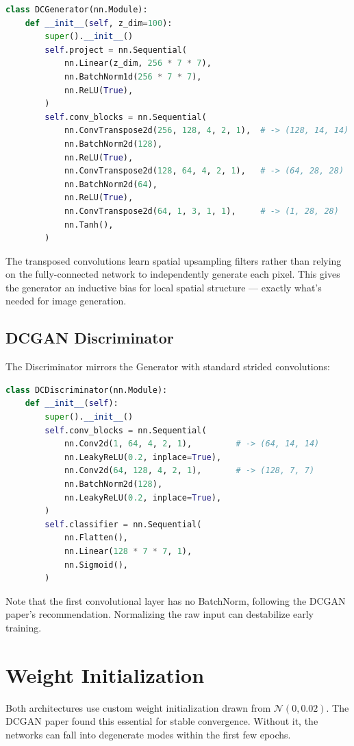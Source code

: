 \documentclass[12pt]{article}
\begin{document}
\begin{lstlisting}[language=Python]
class DCGenerator(nn.Module):
    def __init__(self, z_dim=100):
        super().__init__()
        self.project = nn.Sequential(
            nn.Linear(z_dim, 256 * 7 * 7),
            nn.BatchNorm1d(256 * 7 * 7),
            nn.ReLU(True),
        )
        self.conv_blocks = nn.Sequential(
            nn.ConvTranspose2d(256, 128, 4, 2, 1),  # -> (128, 14, 14)
            nn.BatchNorm2d(128),
            nn.ReLU(True),
            nn.ConvTranspose2d(128, 64, 4, 2, 1),   # -> (64, 28, 28)
            nn.BatchNorm2d(64),
            nn.ReLU(True),
            nn.ConvTranspose2d(64, 1, 3, 1, 1),     # -> (1, 28, 28)
            nn.Tanh(),
        )
\end{lstlisting}

The transposed convolutions learn spatial upsampling filters rather than relying on the fully-connected network to independently generate each pixel. This gives the generator an inductive bias for local spatial structure --- exactly what's needed for image generation.

\subsection{DCGAN Discriminator}
The Discriminator mirrors the Generator with standard strided convolutions:

\begin{lstlisting}[language=Python]
class DCDiscriminator(nn.Module):
    def __init__(self):
        super().__init__()
        self.conv_blocks = nn.Sequential(
            nn.Conv2d(1, 64, 4, 2, 1),         # -> (64, 14, 14)
            nn.LeakyReLU(0.2, inplace=True),
            nn.Conv2d(64, 128, 4, 2, 1),       # -> (128, 7, 7)
            nn.BatchNorm2d(128),
            nn.LeakyReLU(0.2, inplace=True),
        )
        self.classifier = nn.Sequential(
            nn.Flatten(),
            nn.Linear(128 * 7 * 7, 1),
            nn.Sigmoid(),
        )
\end{lstlisting}

Note that the first convolutional layer has no BatchNorm, following the DCGAN paper's recommendation. Normalizing the raw input can destabilize early training.

\section{Weight Initialization}
Both architectures use custom weight initialization drawn from $\mathcal{N}(0, 0.02)$. The DCGAN paper found this essential for stable convergence. Without it, the networks can fall into degenerate modes within the first few epochs.
\end{document}
